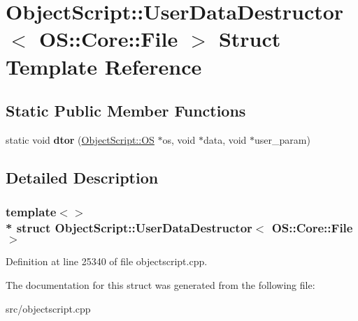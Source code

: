 \hypertarget{struct_object_script_1_1_user_data_destructor_3_01_o_s_1_1_core_1_1_file_01_4}{}\section{Object\+Script\+:\+:User\+Data\+Destructor$<$ OS\+:\+:Core\+:\+:File $>$ Struct Template Reference}
\label{struct_object_script_1_1_user_data_destructor_3_01_o_s_1_1_core_1_1_file_01_4}
\subsection*{Static Public Member Functions}
\begin{DoxyCompactItemize}
\item 
static void {\bfseries dtor} (\hyperlink{class_object_script_1_1_o_s}{Object\+Script\+::\+OS} $\ast$os, void $\ast$data, void $\ast$user\+\_\+param)\hypertarget{struct_object_script_1_1_user_data_destructor_3_01_o_s_1_1_core_1_1_file_01_4_a3fa75fa3016599a74c068c494e596c88}{}\label{struct_object_script_1_1_user_data_destructor_3_01_o_s_1_1_core_1_1_file_01_4_a3fa75fa3016599a74c068c494e596c88}

\end{DoxyCompactItemize}


\subsection{Detailed Description}
\subsubsection*{template$<$$>$\\*
struct Object\+Script\+::\+User\+Data\+Destructor$<$ O\+S\+::\+Core\+::\+File $>$}



Definition at line 25340 of file objectscript.\+cpp.



The documentation for this struct was generated from the following file\+:\begin{DoxyCompactItemize}
\item 
src/objectscript.\+cpp\end{DoxyCompactItemize}
